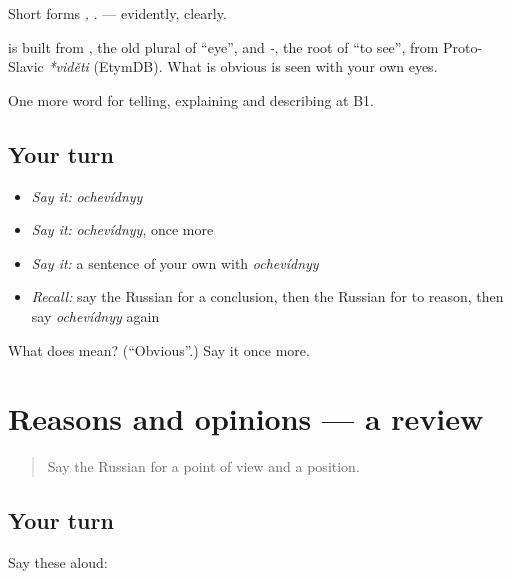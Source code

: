 Short forms \emph{, }. \emph{} — evidently, clearly.

\begin{cousinweb}
\textbf{} is built from \emph{}, the old plural of \emph{} \textquotedblleft{}eye\textquotedblright{}, and \emph{-}, the root of \emph{} \textquotedblleft{}to see\textquotedblright{}, from Proto-Slavic \emph{*viděti} (EtymDB). What is obvious is seen with your own eyes.
\end{cousinweb}

\begin{grammarlens}[title={What you've built}]
One more word for telling, explaining and describing at B1.
\end{grammarlens}

\subsection*{Your turn}
\begin{itemize}
\raggedright
  \item \emph{Say it:} \emph{ochevídnyy}
  \item \emph{Say it:} \emph{ochevídnyy}, once more
  \item \emph{Say it:} a sentence of your own with \emph{ochevídnyy}
  \item \emph{Recall:} say the Russian for a conclusion, then the Russian for to reason, then say \emph{ochevídnyy} again
\end{itemize}

\begin{tcolorbox}[breakable,colback=teal!4,colframe=teal!35!black,title={Before you move on}]
What does  mean? (\textquotedblleft{}Obvious\textquotedblright{}.) Say it once more.
\end{tcolorbox}
\section[(dialogue)]{Reasons and opinions — a review}

\label{lesson:RU-R344-review-337-344}



\begin{quote}
Say the Russian for a point of view and a position.
\end{quote}

\subsection*{Your turn}
Say these aloud:

